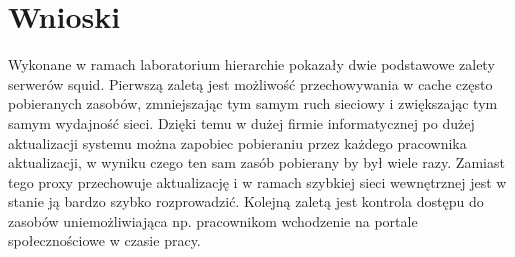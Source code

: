 \documentclass{article}
\begin{document}
\section{Wnioski}
Wykonane w ramach laboratorium hierarchie pokazały dwie podstawowe zalety serwerów squid. Pierwszą zaletą jest możliwość przechowywania w cache często pobieranych zasobów, zmniejszając tym samym ruch sieciowy i zwiększając tym samym wydajność sieci. Dzięki temu w dużej firmie informatycznej po dużej aktualizacji systemu można zapobiec pobieraniu przez każdego pracownika aktualizacji, w wyniku czego ten sam zasób pobierany by był wiele razy. Zamiast tego proxy przechowuje aktualizację i w ramach szybkiej sieci wewnętrznej jest w stanie ją bardzo szybko rozprowadzić. Kolejną zaletą jest kontrola dostępu do zasobów uniemożliwiająca np. pracownikom wchodzenie na portale społecznościowe w czasie pracy. 
\end{document}
